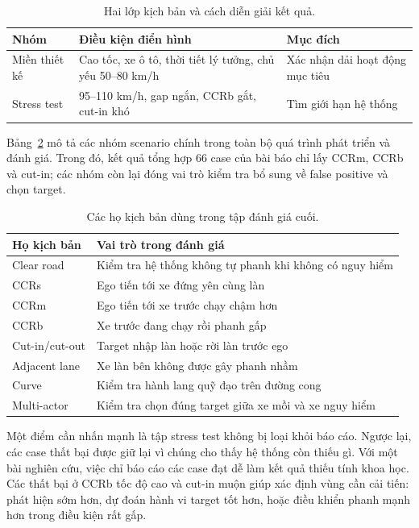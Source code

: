 \documentclass[conference]{IEEEtran}
\begin{document}
\begin{table}[t]
\caption{Hai lớp kịch bản và cách diễn giải kết quả.}
\label{tab:scope}
\centering
\footnotesize
\begin{tabular}{p{}p{}p{}}
\toprule
Nhóm & Điều kiện điển hình & Mục đích \\
\midrule
Miền thiết kế & Cao tốc, xe ô tô, thời tiết lý tưởng, chủ yếu 50--80 km/h & Xác nhận dải hoạt động mục tiêu \\
Stress test & 95--110 km/h, gap ngắn, CCRb gắt, cut-in khó & Tìm giới hạn hệ thống \\
\bottomrule
\end{tabular}
\end{table}

Bảng~\ref{tab:scenariofamilies} mô tả các nhóm scenario chính trong toàn bộ quá trình phát triển và đánh giá. Trong đó, kết quả tổng hợp 66 case của bài báo chỉ lấy CCRm, CCRb và cut-in; các nhóm còn lại đóng vai trò kiểm tra bổ sung về false positive và chọn target.

\begin{table}[t]
\caption{Các họ kịch bản dùng trong tập đánh giá cuối.}
\label{tab:scenariofamilies}
\centering
\footnotesize
\begin{tabular}{p{}p{}}
\toprule
Họ kịch bản & Vai trò trong đánh giá \\
\midrule
Clear road & Kiểm tra hệ thống không tự phanh khi không có nguy hiểm \\
CCRs & Ego tiến tới xe đứng yên cùng làn \\
CCRm & Ego tiến tới xe trước chạy chậm hơn \\
CCRb & Xe trước đang chạy rồi phanh gấp \\
Cut-in/cut-out & Target nhập làn hoặc rời làn trước ego \\
Adjacent lane & Xe làn bên không được gây phanh nhầm \\
Curve & Kiểm tra hành lang quỹ đạo trên đường cong \\
Multi-actor & Kiểm tra chọn đúng target giữa xe mồi và xe nguy hiểm \\
\bottomrule
\end{tabular}
\end{table}

Một điểm cần nhấn mạnh là tập stress test không bị loại khỏi báo cáo. Ngược lại, các case thất bại được giữ lại vì chúng cho thấy hệ thống còn thiếu gì. Với một bài nghiên cứu, việc chỉ báo cáo các case đạt dễ làm kết quả thiếu tính khoa học. Các thất bại ở CCRb tốc độ cao và cut-in muộn giúp xác định vùng cần cải tiến: phát hiện sớm hơn, dự đoán hành vi target tốt hơn, hoặc điều khiển phanh mạnh hơn trong điều kiện rất gấp.
\end{document}
